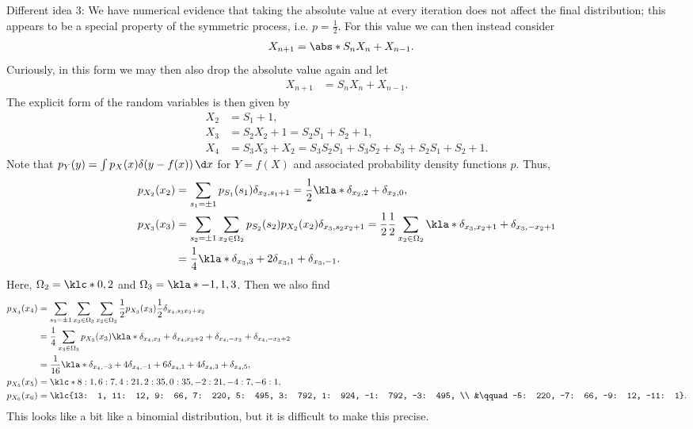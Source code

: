 \documentclass[english, parskip=full]{scrartcl}
\begin{document}
Different idea 3:
We have numerical evidence that taking the absolute value at every iteration does not affect the final distribution; this appears to be a special property of the symmetric process, i.e. $p=\frac{1}{2}$.
For this value we can then instead consider
\begin{align}
X_{n+1} &= \abs*{S_nX_n + X_{n-1}}.
\end{align}
Curiously, in this form we may then also drop the absolute value again and let
\begin{align}
X_{n+1} &= S_nX_n + X_{n-1}.
\end{align}
The explicit form of the random variables is then given by
\begin{align}
X_2 &= S_1 + 1,\\
X_3 &= S_2X_2 + 1 = S_2S_1 + S_2 + 1,\\
X_4 &= S_3X_3 + X_2 = S_3S_2S_1 + S_3S_2 + S_3 + S_2S_1 + S_2 + 1.
\end{align}
Note that $p_Y(y) = \int p_X(x) \delta(y - f(x))\,\d x$ for $Y=f(X)$ and associated probability density functions $p$.
Thus,
\begin{align}
p_{X_2}(x_2) &= \sum_{s_1=\pm 1} p_{S_1}(s_1) \delta_{x_2,s_1+1} = \frac{1}{2} \kla*{\delta_{x_2,2} + \delta_{x_2,0}},\\
p_{X_3}(x_3) &= \sum_{s_2=\pm 1} \sum_{x_2\in \Omega_2} p_{S_2}(s_2) p_{X_2}(x_2) \delta_{x_3, s_2x_2+1} = \frac{1}{2} \frac{1}{2} \sum_{x_2\in\Omega_2} \kla*{\delta_{x_3, x_2+1} + \delta_{x_3, -x_2+1}}\\
&= \frac{1}{4} \kla*{\delta_{x_3, 3} + 2\delta_{x_3, 1} + \delta_{x_3, -1}}.
\end{align}
Here, $\Omega_2=\klc*{0, 2}$ and $\Omega_3 = \kla*{-1,1,3}$.
Then we also find
\begin{align}
p_{X_4}(x_4) &= \sum_{s_3=\pm 1} \sum_{x_3\in\Omega_3} \sum_{x_2\in\Omega_2} \frac{1}{2} p_{X_3}(x_3) \frac{1}{2} \delta_{x_4, s_3x_3+x_2}\\
&= \frac{1}{4} \sum_{x_3\in\Omega_3} p_{X_3}(x_3) \kla*{\delta_{x_4, x_3} + \delta_{x_4,x_3+2} + \delta_{x_4, -x_3} + \delta_{x_4, -x_3+2}}\\
&= \frac{1}{16} \kla*{\delta_{x_4,-3} + 4\delta_{x_4,-1} + 6\delta_{x_4,1} + 4\delta_{x_4,3} + \delta_{x_4,5}},\\
p_{X_5}(x_5) &= \klc*{8: 1, 6: 7, 4: 21, 2: 35, 0: 35, -2: 21, -4: 7, -6: 1},\\
p_{X_6}(x_6) &= \klc{13: 1, 11: 12, 9: 66, 7: 220, 5: 495, 3: 792, 1: 924, -1: 792, -3: 495, \\
&\qquad -5: 220, -7: 66, -9: 12, -11: 1}.
\end{align}
This looks like a bit like a binomial distribution, but it is difficult to make this precise.
\end{document}

